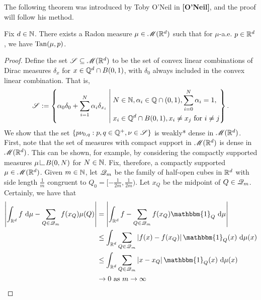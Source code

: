 The following theorem was introduced by Toby O'Neil in \textbf{[O'Neil]}, and the proof will follow his method.
\begin{theorem}[O'Neil] \label{thm:oneil}
    Fix $d \in \mathbb{N}$. There exists a Radon measure $\mu \in \mathscr{M}(\mathbb{R}^d)$ such that for $\mu$-a.e. $p \in \mathbb{R}^d$, we have $\operatorname{Tan}(\mu,p)$.
\end{theorem}
\begin{proof}
    Define the set $\mathscr{S} \subseteq \mathscr{M}(\mathbb{R}^d)$ to be the set of convex linear combinations of Dirac measures $\delta_x$ for $x \in \mathbb{Q}^d \cap B(0,1)$, with $\delta_0$ always included in the convex linear combination. That is,
    \begin{equation} \label{eq:setOfMeasuresForOneilMeasure}
        \mathscr{S} := \left\{ \alpha_0 \delta_0 + \sum_{i=1}^N \alpha_i \delta_{x_i} \;\middle|\;
        \begin{aligned} 
            &N \in \mathbb{N}, \alpha_i \in \mathbb{Q} \cap (0,1), \sum_{i=0}^N \alpha_i = 1, \\
            &x_i \in \mathbb{Q}^d \cap B(0,1), x_i \neq x_j \text{ for } i \neq j 
        \end{aligned}
        \right\}.
    \end{equation}
    We show that the set $\{ p\nu_{0,q} : p,q \in \mathbb{Q}^+, \nu \in \mathscr{S} \}$ is weakly* dense in $\mathscr{M}(\mathbb{R}^d)$. First, note that the set of measures with compact support in $\mathscr{M}(\mathbb{R}^d)$ is dense in $\mathscr{M}(\mathbb{R}^d)$. This can be shown, for example, by considering the compactly supported measures $\mu \restrict B(0,N)$ for $N \in \mathbb{N}$. 
    Fix, therefore, a compactly supported $\mu \in \mathscr{M}(\mathbb{R}^d)$. Given $m \in \mathbb{N}$, let $\mathscr{Q}_m$ be the family of half-open cubes in $\mathbb{R}^d$ with side length $\frac{1}{m}$ congruent to $Q_0 = [-\frac{1}{2m},\frac{1}{2m})$. Let $x_Q$ be the midpoint of $Q \in \mathscr{Q}_m$. Certainly, we have that
    \begin{equation} \label{eq:riemsum}
        \begin{aligned}
            \abs{ \int_{\bbR^d} f \, \d{\mu} - \sum_{Q \in \scrQ_m} f(x_Q)\mu(Q) } 
            &= \abs{ \int_{\bbR^d} f - \sum_{Q \in \scrQ_m} f(x_Q) \mathbbm{1}_Q \, \d{\mu} } \\
            &\leq \int_{\bbR^d} \sum_{Q \in \scrQ_m} \abs{ f(x) - f(x_Q) } \mathbbm{1}_Q(x) \, \d{\mu(x)} \\
            &\leq \int_{\bbR^d} \sum_{Q \in \scrQ_m} \abs{x-x_Q} \mathbbm{1}_Q(x) \, \d{\mu(x)} \\
            &\rightarrow 0 \text{ as } m \to \infty

\end{aligned}
\end{equation}
\end{proof}
